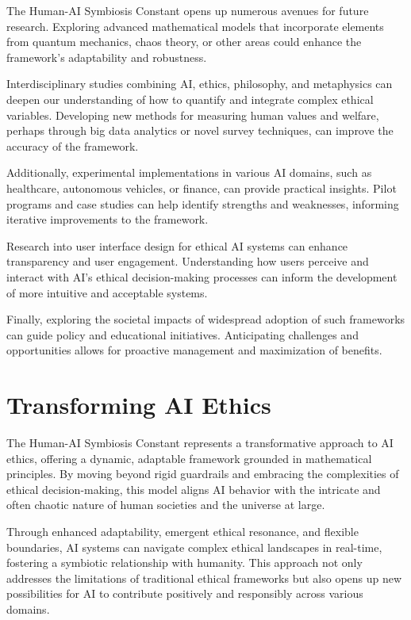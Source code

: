 \documentclass[12pt]{article}
\begin{document}
The Human-AI Symbiosis Constant opens up numerous avenues for future research. Exploring advanced mathematical models that incorporate elements from quantum mechanics, chaos theory, or other areas could enhance the framework's adaptability and robustness.

Interdisciplinary studies combining AI, ethics, philosophy, and metaphysics can deepen our understanding of how to quantify and integrate complex ethical variables. Developing new methods for measuring human values and welfare, perhaps through big data analytics or novel survey techniques, can improve the accuracy of the framework.

Additionally, experimental implementations in various AI domains, such as healthcare, autonomous vehicles, or finance, can provide practical insights. Pilot programs and case studies can help identify strengths and weaknesses, informing iterative improvements to the framework.

Research into user interface design for ethical AI systems can enhance transparency and user engagement. Understanding how users perceive and interact with AI's ethical decision-making processes can inform the development of more intuitive and acceptable systems.

Finally, exploring the societal impacts of widespread adoption of such frameworks can guide policy and educational initiatives. Anticipating challenges and opportunities allows for proactive management and maximization of benefits.

\section{Transforming AI Ethics}

The Human-AI Symbiosis Constant represents a transformative approach to AI ethics, offering a dynamic, adaptable framework grounded in mathematical principles. By moving beyond rigid guardrails and embracing the complexities of ethical decision-making, this model aligns AI behavior with the intricate and often chaotic nature of human societies and the universe at large.

Through enhanced adaptability, emergent ethical resonance, and flexible boundaries, AI systems can navigate complex ethical landscapes in real-time, fostering a symbiotic relationship with humanity. This approach not only addresses the limitations of traditional ethical frameworks but also opens up new possibilities for AI to contribute positively and responsibly across various domains.
\end{document}
